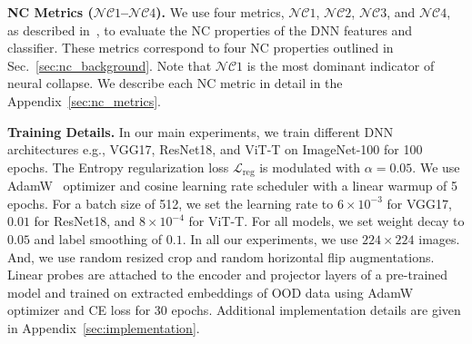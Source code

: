 


\noindent
\textbf{NC Metrics ($\mathcal{NC}1$–$\mathcal{NC}4$).}
We use four metrics, $\mathcal{NC}1$, $\mathcal{NC}2$, $\mathcal{NC}3$, and $\mathcal{NC}4$, as described in~\cite{zhu2021geometric, zhou2022all}, to evaluate the NC properties of the DNN features and classifier. These metrics correspond to four NC properties outlined in Sec.~\ref{sec:nc_background}. 
Note that $\mathcal{NC}1$ is the most dominant indicator of neural collapse.
We describe each NC metric in detail in the Appendix~\ref{sec:nc_metrics}. 

\noindent
\textbf{Training Details.}
In our main experiments, we train different DNN architectures e.g., VGG17, ResNet18, and ViT-T on ImageNet-100 for 100 epochs.
The Entropy regularization loss $\mathcal{L}_{\mathrm{reg}}$ is modulated with $\alpha=0.05$. %
We use AdamW~\cite{loshchilov2017decoupled}  optimizer and cosine learning rate scheduler with a linear warmup of 5 epochs. For a batch size of 512, we set the learning rate to $6\times 10^{-3}$ for VGG17, $0.01$ for ResNet18, and $8\times 10^{-4}$ for ViT-T. For all models, we set weight decay to $0.05$ and label smoothing of $0.1$. 
In all our experiments, we use $224\times 224$ images. And, we use random resized crop and random horizontal flip augmentations.
Linear probes are attached to the encoder and projector layers of a pre-trained model and trained on extracted embeddings of OOD data using AdamW optimizer and CE loss for 30 epochs. Additional implementation details are given in Appendix~\ref{sec:implementation}.


